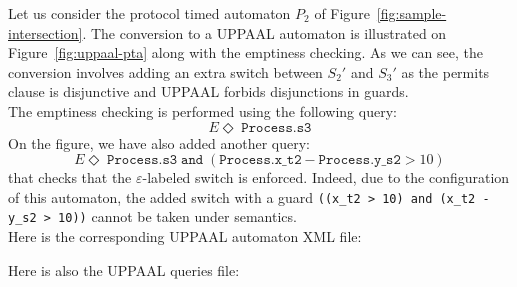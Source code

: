 Let us consider the protocol timed automaton $P_2$ of Figure~\ref{fig:sample-intersection}. The conversion to a UPPAAL automaton is illustrated on Figure~\ref{fig:uppaal-pta} along with the emptiness checking. As we can see, the conversion involves adding an extra switch between $S_2'$ and $S_3'$ as the permits clause is disjunctive and UPPAAL forbids disjunctions in guards.\\

The emptiness checking is performed using the following query:
$$ E\Diamond\; \mathtt{Process.s3} $$
On the figure, we have also added another query:
$$ E\Diamond\; \mathtt{Process.s3} \;\mathtt{and}\; (\mathtt{Process.x\_t2} - \mathtt{Process.y\_s2} > 10)$$
that checks that the $\varepsilon$-labeled switch is enforced. Indeed, due to the configuration of this automaton, the added switch with a guard \texttt{((x\_t2 > 10) and (x\_t2 - y\_s2 > 10))} cannot be taken under \MInvoke semantics.\\

Here is the corresponding UPPAAL automaton XML file:
{
  \footnotesize
  
}

Here is also the UPPAAL queries file:
{
  \footnotesize
  
}

